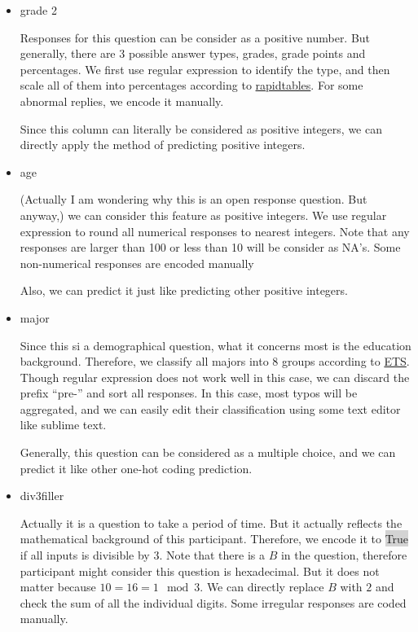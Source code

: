\documentclass[11pt, a4paper]{article}
\begin{document}
\begin{itemize}
	\item {grade 2}
	\par{Responses for this question can be consider as a positive number. But generally, there are 3 possible answer types, grades, grade points and percentages. We first use regular expression to identify the type, and then scale all of them into percentages according to \href{https://www.rapidtables.com/calc/grade/gpa-to-letter-grade-calculator.html}{rapidtables}. For some abnormal replies, we encode it manually.}
	\par{Since this column can literally be considered as positive integers, we can directly apply the method of predicting positive integers.}
	
	\item {age}
	\par{(Actually I am wondering why this is an open response question. But anyway,) we can consider this feature as positive integers. We use regular expression to round all numerical responses to nearest integers. Note that any responses are larger than 100 or less than 10 will be consider as NA's. Some non-numerical responses are encoded manually}
	\par{Also, we can predict it just like predicting other positive integers.}
	
	\item {major}
	\par{Since this si a demographical question, what it concerns most is the education background. Therefore, we classify all majors into 8 groups according to \href{https://www.ets.org/s/gre/pdf/dept_major_field_codes.pdf}{ETS}. Though regular expression does not work well in this case, we can discard the prefix ``pre-'' and sort all responses. In this case, most typos will be aggregated, and we can easily edit their classification using some text editor like sublime text.}
	\par{Generally, this question can be considered as a multiple choice, and we can predict it like other one-hot coding prediction.}
	
	\item {div3filler}
	\par{Actually it is a question to take a period of time. But it actually reflects the mathematical background of this participant. Therefore, we encode it to \colorbox{lightgray}{True} if all inputs is divisible by 3. Note that there is a $B$ in the question, therefore participant might consider this question is hexadecimal. But it does not matter because $10 = 16 = 1 \mod 3$. We can directly replace $B$ with $2$ and check the sum of all the individual digits. Some irregular responses are coded manually.}
	

\end{itemize}
\end{document}

